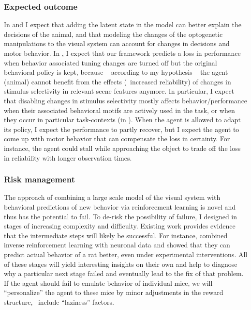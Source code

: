 \documentclass[B2,COG]{ercgrant}
\begin{document}
\subsubsection{Expected outcome} 
In  and  I expect that adding the latent state in the model can better explain the decisions of the animal, and that modeling the changes of the optogenetic manipulations to the visual system can account for changes in decisions and motor behavior. 
In , I expect that our framework predicts a loss in performance when behavior associated tuning changes are turned off but the original behavioral policy is kept, because -- according to my hypothesis -- the agent (animal) cannot benefit from the effects (\ie~increased reliability) of changes in stimulus selectivity in relevant scene features anymore. 
In particular, I expect that disabling changes in stimulus selectivity mostly affects behavior/performance when their associated behavioral motifs are actively used in the task, or when they occur in particular task-contexts (in ).
When the agent is allowed to adapt its policy, I expect the performance to partly recover, but I expect the agent to come up with motor behavior that can compensate the loss in certainty. 
For instance, the agent could stall while approaching the object to trade off the loss in reliability with longer observation times. 


\subsubsection{Risk management} 
The approach of combining a large scale model of the visual system with behavioral predictions of new behavior via reinforcement learning is novel and thus has the potential to fail. 
To de-risk the possibility of failure, I designed  in stages of increasing complexity and difficulty. 
Existing work provides evidence that the intermediate steps will likely be successful.  
For instance, \textcite{Kalweit2022-ev} combined inverse reinforcement learning with neuronal data and showed that they can predict actual behavior of a rat better, even under experimental interventions. 
All of these stages will yield interesting insights on their own and help to diagnose why a particular next stage failed and eventually lead to the fix of that problem. If the agent should fail to emulate behavior of individual mice, we will ``personalize'' the agent to these mice by minor adjustments in the reward structure, \eg~include ``laziness'' factors.
\end{document}
